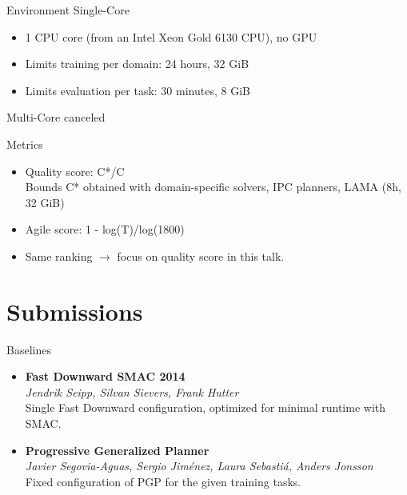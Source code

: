 \documentclass[aspectratio=169,xcolor=dvipsnames]{beamer}
\begin{document}
\begin{frame}{Environment}
    Single-Core
    \begin{itemize}
        \item 1 CPU core (from an Intel Xeon Gold 6130 CPU), no GPU
        \item Limits \alert{training} per domain: 24 hours, 32 GiB
        \item Limits \alert{evaluation} per task: 30 minutes, 8 GiB
    \end{itemize}

    \bigskip
    Multi-Core canceled
\end{frame}

\begin{frame}{Metrics}
    \begin{itemize}
        \item Quality score: C*/C\\
        Bounds C* obtained with domain-specific solvers, IPC planners, LAMA (8h, 32 GiB)
        \item Agile score: 1 - log(T)/log(1800)
        \item Same ranking $\to$ focus on quality score in this talk.
    \end{itemize}
\end{frame}

\section{Submissions}

\begin{frame}{Baselines}
\begin{itemize}
\item
    \textbf{Fast Downward SMAC 2014}\\
    \emph{Jendrik Seipp, Silvan Sievers, Frank Hutter}\\
    Single Fast Downward
    configuration, optimized for minimal runtime with SMAC.
\item
    \textbf{Progressive Generalized Planner}\\
    \emph{Javier
    Segovia-Aguas, Sergio Jiménez, Laura Sebastiá, Anders Jonsson}\\
    Fixed configuration of PGP for the given training tasks.
\end{itemize}
\end{frame}
\end{document}
